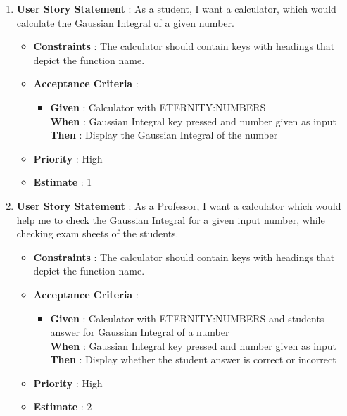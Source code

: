 \documentclass{article}
\begin{document}
\begin{enumerate}
        \item \textbf{User Story Statement} : As a student, I want a calculator, which would calculate the Gaussian Integral of a given number.
    \begin{itemize}
        \item \textbf{Constraints} : The calculator should contain keys with headings that depict the function name. 
        \item \textbf{Acceptance Criteria} : 
            \begin{itemize}
                \item \textbf{Given} : Calculator with ETERNITY:NUMBERS \\
                \textbf{When} : Gaussian Integral key pressed and number given as input\\
                \textbf{Then} : Display the Gaussian Integral of the number
            \end{itemize}
        \item \textbf{Priority} : High
        \item \textbf{Estimate} : 1
    \end{itemize}
    
        \item \textbf{User Story Statement} : As a Professor, I want a calculator which would help me to check the Gaussian Integral for a given input number, while checking exam sheets of the students.
    \begin{itemize}
        \item \textbf{Constraints} : The calculator should contain keys with headings that depict the function name. 
        \item \textbf{Acceptance Criteria} : 
            \begin{itemize}
                \item \textbf{Given} : Calculator with ETERNITY:NUMBERS and students answer for Gaussian Integral of a number \\
                \textbf{When} : Gaussian Integral key pressed and number given as input\\
                \textbf{Then} : Display whether the student answer is correct or incorrect
            \end{itemize}
        \item \textbf{Priority} : High
        \item \textbf{Estimate} : 2
    \end{itemize}
    

\end{enumerate}
\end{document}
